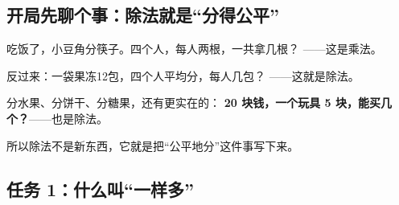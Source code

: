 \subsection{开局先聊个事：除法就是“分得公平”}

吃饭了，小豆角分筷子。四个人，每人两根，一共拿几根？
——这是乘法。

反过来：一袋果冻12包，四个人平均分，每人几包？
——这就是除法。

分水果、分饼干、分糖果，还有更实在的：
\textbf{20 块钱，一个玩具 5 块，能买几个？}——也是除法。

所以除法不是新东西，它就是把“公平地分”这件事写下来。

\subsection{任务 1：什么叫“一样多”}


